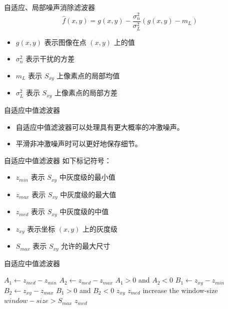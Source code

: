 \documentclass[presentation]{beamer}
\begin{document}
\begin{frame}[label={sec:orgc8912b3}]{自适应、局部噪声消除滤波器}
\[ \hat f(x,y)=g(x,y)-\frac{\sigma_n^2}{\sigma_L^2}(g(x,y)-m_L) \]

\begin{itemize}
\item \(g(x,y)\) 表示图像在点 \((x,y)\) 上的值
\item \(\sigma^2_n\) 表示干扰的方差
\item \(m_L\) 表示 \(S_{xy}\) 上像素点的局部均值
\item \(\sigma_L^2\) 表示 \(S_{xy}\) 上像素点的局部方差
\end{itemize}
\end{frame}

\begin{frame}[label={sec:org297659e}]{自适应中值滤波器}
\begin{itemize}
\item 自适应中值滤波器可以处理具有更大概率的冲激噪声。
\item 平滑非冲激噪声时可以更好地保存细节。
\end{itemize}
\end{frame}

\begin{frame}[label={sec:org8d389e0}]{自适应中值滤波器}
如下标记符号：
\begin{itemize}
\item \(z_{min}\) 表示 \(S_{xy}\) 中灰度级的最小值
\item \(z_{max}\) 表示 \(S_{xy}\) 中灰度级的最大值
\item \(z_{med}\) 表示 \(S_{xy}\) 中灰度级的中值
\item \(z_{xy}\) 表示坐标 \((x,y)\) 上的灰度级
\item \(S_{max}\) 表示 \(S_{xy}\) 允许的最大尺寸
\end{itemize}
\end{frame}

\begin{frame}[label={sec:org7e6e702}]{自适应中值滤波器}
 \begin{codebox}
 \zi      \Repeat
 \zi    $ A_1 \gets z_{med}-z_{min}$ 
 \zi    $ A_2 \gets z_{med}-z_{max}$ 
 \zi    \If  $A_1>0$ and  $A_2<0$ 
 \zi        \Then 
 \zi             $ B_1 \gets z_{xy}-z_{min}$ 
 \zi             $ B_2 \gets z_{xy}-z_{max}$ 
 \zi             \If  $B_1>0$ and  $ B_2<0$ 
 \zi               \Then \Return $z_{xy}$
 \zi               \Else \Return $z_{med}$
                 \End
 \zi        \Else increase the window-size
        \End  
 \zi \Until $window-size > S_{max}$ 
 \zi \Return $z_{med}$
 \end{codebox}
\end{frame}
\end{document}
